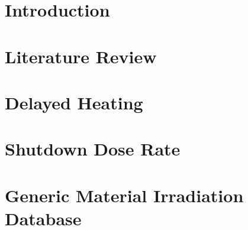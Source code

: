 \documentclass{uiucthesis2021}
\begin{document}
{
    \hypersetup{linkcolor=black}  %
    \tableofcontents
}





\mainmatter

\chapter{Introduction}


\chapter{Literature Review}


\chapter{Delayed Heating}


\chapter{Shutdown Dose Rate}


\chapter{Generic Material Irradiation Database}

\end{document}
